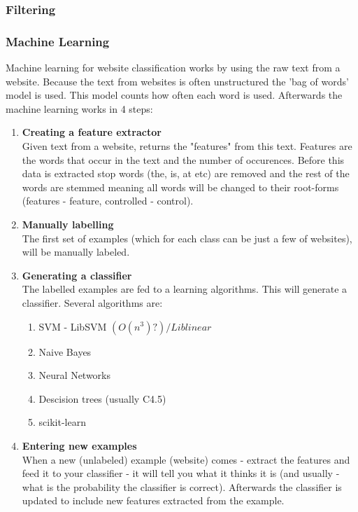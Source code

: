 \subsubsection{Filtering}
\subsubsection{Machine Learning}
Machine learning for website classification works by using the raw text from a website. Because the text from websites is often unstructured the 'bag of words' model is used. This model counts how often each word is used. Afterwards the machine learning works in 4 steps:
\begin{enumerate}
    \item \textbf{Creating a feature extractor} \\
    Given text from a website, returns the "features" from this text. Features are the words that occur in the text and the number of occurences. Before this data is extracted stop words (the, is, at etc) are removed and the rest of the words are stemmed meaning all words will be changed to their root-forms (features - feature, controlled - control).
    \item \textbf{Manually labelling} \\
    The first set of examples (which for each class can be just a few of websites), will be manually labeled. 
    \item {} \textbf{Generating a classifier} \\
    The labelled examples are fed to a learning algorithms. This will generate a classifier. Several algorithms are:
    \begin{enumerate}
        \item SVM - LibSVM $(O(n^3)?) / Liblinear$
        \item Naive Bayes
        \item Neural Networks
        \item Descision trees (usually C4.5)
        \item scikit-learn
    \end{enumerate}
    \item \textbf{Entering new examples} \\
    When a new (unlabeled) example (website) comes - extract the features and feed it to your classifier - it will tell you what it thinks it is (and usually - what is the probability the classifier is correct). Afterwards the classifier is updated to include new features extracted from the example.
\end{enumerate}


